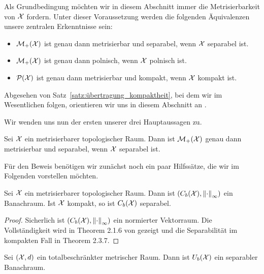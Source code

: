 \documentclass[../thesis/thesis.tex]{subfiles}
\begin{document}
	Als Grundbedingung möchten wir in diesem Abschnitt immer die Metrisierbarkeit von $\mathcal{X}$ fordern.
	Unter dieser Voraussetzung werden die folgenden Äquivalenzen unsere zentralen Erkenntnisse sein:
	\vspace*{0.5em}
	\begin{itemize}
		\item $\mathcal{M}_{+}(\mathcal{X})$ ist genau dann metrisierbar und separabel, wenn $\mathcal{X}$ separabel ist.
		\item $\mathcal{M}_{+}(\mathcal{X})$ ist genau dann polnisch, wenn $\mathcal{X}$ polnisch ist.
		\item $\mathcal{P}(\mathcal{X})$ ist genau dann metrisierbar und kompakt, wenn $\mathcal{X}$ kompakt ist.
	\end{itemize}
	\vspace*{0.5em}
	Abgesehen von Satz~\ref{satz:übertragung_kompaktheit}, bei dem wir im Wesentlichen \cite{vanGaans.200203} folgen, orientieren wir uns in diesem Abschnitt an \cite{Varadarajan.1958}.
	
	Wir wenden uns nun der ersten unserer drei Hauptaussagen zu.
	
	\begin{Satz}
		\label{satz:übertragung_metrisierbarkeit_separabilität}
		Sei $\mathcal{X}$ ein metrisierbarer topologischer Raum. Dann ist $\mathcal{M}_{+}(\mathcal{X})$ genau dann metrisierbar und separabel, wenn $\mathcal{X}$ separabel ist.
	\end{Satz}

	Für den Beweis benötigen wir zunächst noch ein paar Hilfssätze, die wir im Folgenden vorstellen möchten.
	
	\begin{Hilfssatz}
		\label{hilfssatz:beschränkte_stetige_funktionen_banachraum}
		Sei $\mathcal{X}$ ein metrisierbarer topologischer Raum. Dann ist $(C_b(\mathcal{X}), \left\lVert\cdot\right\rVert_\infty)$ ein Banachraum. Ist $\mathcal{X}$ kompakt, so ist $C_b(\mathcal{X})$ separabel.
	\end{Hilfssatz}

	\begin{proof}
		Sicherlich ist $(C_b(\mathcal{X}), \left\lVert\cdot\right\rVert_\infty)$ ein normierter Vektorraum. 
		Die Vollständigkeit wird in Theorem 2.1.6 von \cite{Simon.2015} gezeigt und die Separabilität im kompakten Fall in Theorem 2.3.7.
	\end{proof}
	
	\begin{Hilfssatz}
		\label{hilfssatz:beschränkte_glm_stetige_funktionen_banachraum}
		Sei $(\mathcal{X}, d)$ ein totalbeschränkter metrischer Raum. Dann ist $U_b(\mathcal{X})$ ein separabler Banachraum.
	\end{Hilfssatz}
	
\end{document}
